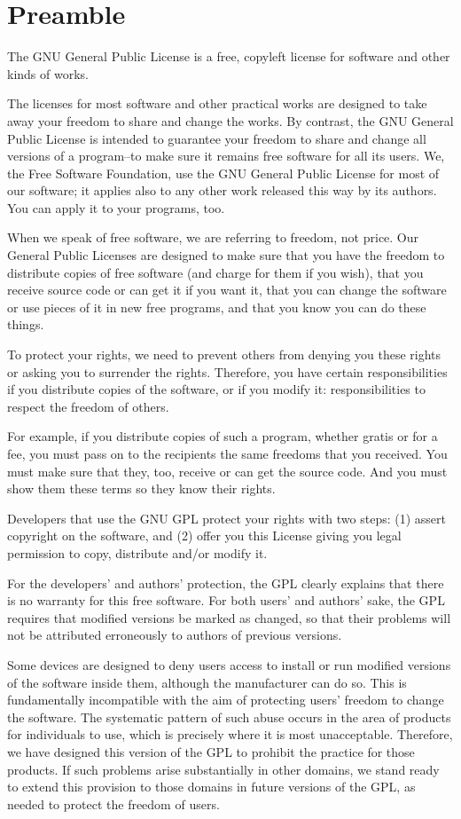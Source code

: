 \section{Preamble}
The GNU General Public License is a free, copyleft license for software and other kinds of works.\par
The licenses for most software and other practical works are designed to take away your freedom to share and change the works. By contrast, the GNU General Public License is intended to guarantee your freedom to share and change all versions of a program--to make sure it remains free software for all its users. We, the Free Software Foundation, use the GNU General Public License for most of our software; it applies also to any other work released this way by its authors. You can apply it to your programs, too.\par
When we speak of free software, we are referring to freedom, not price. Our General Public Licenses are designed to make sure that you have the freedom to distribute copies of free software (and charge for them if you wish), that you receive source code or can get it if you want it, that you can change the software or use pieces of it in new free programs, and that you know you can do these things.\par
To protect your rights, we need to prevent others from denying you these rights or asking you to surrender the rights. Therefore, you have certain responsibilities if you distribute copies of the software, or if you modify it: responsibilities to respect the freedom of others.\par
For example, if you distribute copies of such a program, whether gratis or for a fee, you must pass on to the recipients the same freedoms that you received. You must make sure that they, too, receive or can get the source code. And you must show them these terms so they know their rights.\par
Developers that use the GNU GPL protect your rights with two steps: (1) assert copyright on the software, and (2) offer you this License giving you legal permission to copy, distribute and/or modify it.\par
For the developers' and authors' protection, the GPL clearly explains that there is no warranty for this free software. For both users' and authors' sake, the GPL requires that modified versions be marked as changed, so that their problems will not be attributed erroneously to authors of previous versions.\par
Some devices are designed to deny users access to install or run modified versions of the software inside them, although the manufacturer can do so. This is fundamentally incompatible with the aim of protecting users' freedom to change the software. The systematic pattern of such abuse occurs in the area of products for individuals to use, which is precisely where it is most unacceptable. Therefore, we have designed this version of the GPL to prohibit the practice for those products. If such problems arise substantially in other domains, we stand ready to extend this provision to those domains in future versions of the GPL, as needed to protect the freedom of users.\par
